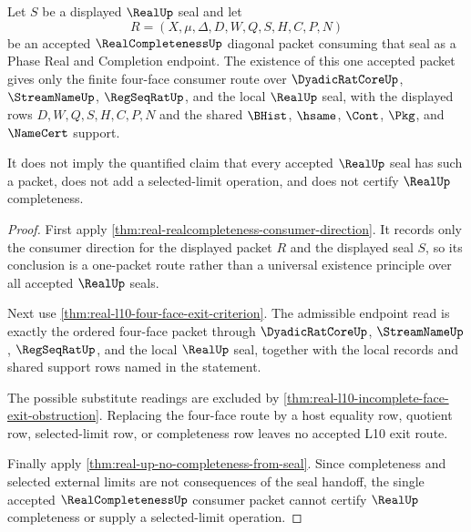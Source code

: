 \begin{theorem}
\label{thm:real-l10-single-completion-packet-not-completeness}
Let $S$ be a displayed $\RealUp$ seal and let
$$
R=(X,\mu,\Delta,D,W,Q,S,H,C,P,N)
$$
be an accepted $\RealCompletenessUp$ diagonal packet consuming that seal as a Phase Real and Completion endpoint. The existence of this one accepted packet gives only the finite four-face consumer route over $\DyadicRatCoreUp$, $\StreamNameUp$, $\RegSeqRatUp$, and the local $\RealUp$ seal, with the displayed rows $D,W,Q,S,H,C,P,N$ and the shared $\BHist$, $\hsame$, $\Cont$, $\Pkg$, and $\NameCert$ support.

It does not imply the quantified claim that every accepted $\RealUp$ seal has such a packet, does not add a selected-limit operation, and does not certify $\RealUp$ completeness.
\end{theorem}
\begin{proof}
First apply \autoref{thm:real-realcompleteness-consumer-direction}. It records only the consumer direction for the displayed packet $R$ and the displayed seal $S$, so its conclusion is a one-packet route rather than a universal existence principle over all accepted $\RealUp$ seals.

Next use \autoref{thm:real-l10-four-face-exit-criterion}. The admissible endpoint read is exactly the ordered four-face packet through $\DyadicRatCoreUp$, $\StreamNameUp$, $\RegSeqRatUp$, and the local $\RealUp$ seal, together with the local records and shared support rows named in the statement.

The possible substitute readings are excluded by \autoref{thm:real-l10-incomplete-face-exit-obstruction}. Replacing the four-face route by a host equality row, quotient row, selected-limit row, or completeness row leaves no accepted L10 exit route.

Finally apply \autoref{thm:real-up-no-completeness-from-seal}. Since completeness and selected external limits are not consequences of the seal handoff, the single accepted $\RealCompletenessUp$ consumer packet cannot certify $\RealUp$ completeness or supply a selected-limit operation.
\end{proof}

